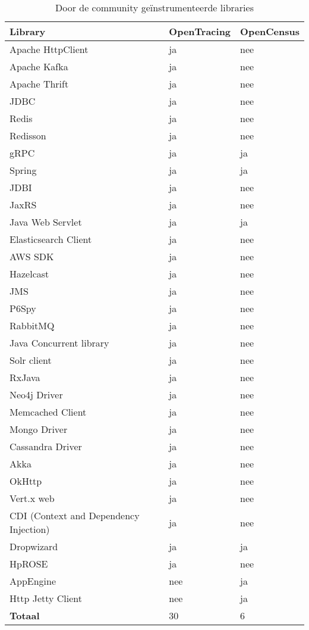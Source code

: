 \begin{table}
	\label{tbl:instrumented_libraries}
	\caption{Door de community geïnstrumenteerde libraries}
	\begin{center}
	\begin{tabular}{| p{5cm} | l | l |}
	\hline
	\textbf{Library} & \textbf{OpenTracing} & \textbf{OpenCensus} \\ \hline \hline
	Apache HttpClient & ja & nee \\ \hline
	Apache Kafka & ja & nee \\ \hline
	Apache Thrift & ja & nee \\ \hline
	JDBC & ja & nee \\ \hline
	Redis & ja & nee \\ \hline
	Redisson & ja & nee \\ \hline
	gRPC & ja & ja \\ \hline
	Spring & ja & ja \\ \hline
	JDBI & ja & nee \\ \hline
	JaxRS & ja & nee \\ \hline
	Java Web Servlet & ja & ja \\ \hline
	Elasticsearch Client & ja & nee \\ \hline
	AWS SDK & ja & nee \\ \hline
	Hazelcast & ja & nee \\ \hline
	JMS & ja & nee \\ \hline
	P6Spy & ja & nee \\ \hline
	RabbitMQ & ja & nee \\ \hline
	Java Concurrent library & ja & nee \\ \hline
	Solr client & ja & nee \\ \hline
	RxJava & ja & nee \\ \hline
	Neo4j Driver & ja & nee \\ \hline
	Memcached Client & ja & nee \\ \hline
	Mongo Driver & ja & nee \\ \hline
	Cassandra Driver & ja & nee \\ \hline
	Akka & ja & nee \\ \hline
	OkHttp & ja & nee \\ \hline
	Vert.x web & ja & nee \\ \hline
	CDI (Context and Dependency Injection) & ja & nee \\ \hline
	Dropwizard & ja & ja \\ \hline
	HpROSE & ja & nee \\ \hline
	AppEngine & nee & ja \\ \hline
	Http Jetty Client & nee & ja \\ \hline \hline
	\textbf{Totaal} & 30 & 6 \\ \hline
	\end{tabular}
\end{center}
\end{table}

